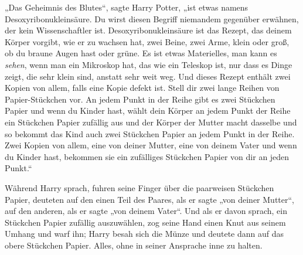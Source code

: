 „Das Geheimnis des Blutes“, sagte Harry Potter, „ist etwas namens Desoxyribonukleinsäure. Du wirst diesen Begriff niemandem gegenüber erwähnen, der kein Wissenschaftler ist. Desoxyribonukleinsäure ist das Rezept, das deinem Körper vorgibt, wie er zu wachsen hat, zwei Beine, zwei Arme, klein oder groß, ob du braune Augen hast oder grüne. Es ist etwas Materielles, man kann es \emph{sehen}, wenn man ein Mikroskop hat, das wie ein Teleskop ist, nur dass es Dinge zeigt, die sehr klein sind, anstatt sehr weit weg. Und dieses Rezept enthält zwei Kopien von allem, falls eine Kopie defekt ist. Stell dir zwei lange Reihen von Papier-Stückchen vor. An jedem Punkt in der Reihe gibt es zwei Stückchen Papier und wenn du Kinder hast, wählt dein Körper an jedem Punkt der Reihe ein Stückchen Papier zufällig aus und der Körper der Mutter macht dasselbe und so bekommt das Kind auch zwei Stückchen Papier an jedem Punkt in der Reihe. Zwei Kopien von allem, eine von deiner Mutter, eine von deinem Vater und wenn du Kinder hast, bekommen sie ein zufälliges Stückchen Papier von dir an jeden Punkt.“

Während Harry sprach, fuhren seine Finger über die paarweisen Stückchen Papier, deuteten auf den einen Teil des Paares, als er sagte „von deiner Mutter“, auf den anderen, als er sagte „von deinem Vater“. Und als er davon sprach, ein Stückchen Papier zufällig auszuwählen, zog seine Hand einen Knut aus seinem Umhang und warf ihn; Harry besah sich die Münze und deutete dann auf das obere Stückchen Papier. Alles, ohne in seiner Ansprache inne zu halten.

